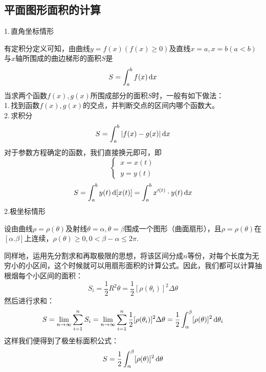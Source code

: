 \subsection{平面图形面积的计算}
1.$\,$直角坐标情形
\par 有定积分定义可知，由曲线$y=f(x)(f(x)\geq 0)$及直线$x=a,x=b(a<b)$与$x$轴所围成的曲边梯形的面积$S$是
\begin{equation}
	S=\int_{a}^{b}f(x)\,{\rm{d}} x
\end{equation}
当求两个函数$f(x),g(x)$所围成部分的面积$S$时，一般有如下做法：\\
1.$\,$找到函数$f(x),g(x)$的交点，并判断交点的区间内哪个函数大。\\
2.$\,$求积分
\begin{equation}
	S=\int_{a}^{b}|f(x)-g(x)|\,{\rm{d}} x
\end{equation}
对于参数方程确定的函数，我们直接换元即可，即
\begin{equation}
	\nonumber
	\begin{cases}
		\, x=x(t)\\
		\, y=y(t)
	\end{cases}
\end{equation}
\begin{equation}
	S=\int_{a}^{b}y(t)\,{\rm{d}} [x(t)]=\int_{a}^{b}x'^{(t)}\cdot y(t)\,{\rm{d}} x
\end{equation}
2.极坐标情形
\par 设由曲线$\rho=\rho(\theta)$及射线$\theta=\alpha,\theta=\beta$围成一个图形（曲面扇形），且$\rho=\rho(\theta)$在$[\alpha.\beta]$上连续，$\rho(\theta)\geq0,0<\beta-\alpha\leq 2\pi$.
\par 同样地，运用先分割求和再取极限的思想，将该区间分成$n$等份，对每个长度为无穷小的小区间，这个时候就可以用扇形面积的计算公式。因此，我们都可以计算抽根烟每个小区间的面积：
\begin{equation}
	S_i=\frac{1}{2}R^2\theta=\frac{1}{2}[\rho(\theta_i)]^2\Delta \theta
	\end{equation}
然后进行求和：
\begin{equation}
	S=\lim\limits_{n\to \infty}\sum_{i=1}^{n}S_i=\lim\limits_{n\to\infty}\sum_{i=1}^{n}\frac{1}{2}[\rho(\theta_i)]^2\Delta \theta=\frac{1}{2}\int_{\alpha}^{\beta}[\rho(\theta)]^2\,{\rm{d}} \theta_i
\end{equation}
这样我们便得到了极坐标面积公式：
\begin{equation}
	S=\frac{1}{2}\int_{\alpha}^{\beta}[\rho(\theta)]^2\,{\rm{d}} \theta
\end{equation}
